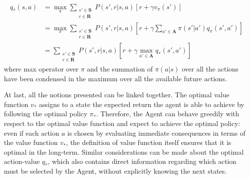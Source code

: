             \begin{definition}
                \label{def:bellmanoptaction}
                \begin{align*}
                    q_{*}(s,a)  &= \max_{\pi}
                                \sum_{\substack{s' \in \mathbf{S}\\r \in \mathbf{R}}} P(s', r | s, a) 
                                \left[ r + \gamma v_{\pi}(s') \right] \\        
                                &= \max_{\pi}
                                \sum_{\substack{s' \in \mathbf{S}\\r \in \mathbf{R}}} P(s', r | s, a) 
                                \left[ r + \gamma \sum_{a' \in \mathbf{A}} \pi(s'|a') q_{\pi}(s',a') \right]\\
                                &= \sum_{\substack{s' \in \mathbf{S}\\r \in \mathbf{R}}} P(s', r | s, a) 
                                \left[ r + \gamma \max_{a' \in \mathbf{A}} q_{*}(s', a') \right]
                \end{align*}
                where max operator over $\pi$ and the summation of $\pi(a|s)$ over all the actions have been condensed in the maximum over all the available future actions.
            \end{definition}
            \noindent
            At last, all the notions presented can be linked together. The optimal value function $v_{*}$ assigns to a state the expected return the agent is able to achieve by following the optimal policy $\pi_{*}$. Therefore, the Agent can behave greedily with respect to the optimal value function and expect to achieve the optimal policy: even if each action $a$ is chosen by evaluating immediate consequences in terms of the value function $v_{*}$, the definition of value function itself ensures that it is optimal in the long-term. Similar considerations can be made about the optimal action-value $q_{*}$, which also contains direct information regarding which action must be selected by the Agent, without explicitly knowing the next states. 
         

